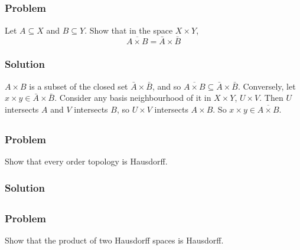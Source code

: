 
\setcounter{subsection}{8} %
\subsection{}
\subsubsection{Problem}
Let $A \subseteq X$ and $B \subseteq Y$. Show that in the space $X \times Y$,
\[\overline{A \times B} = \bar A \times \bar B \]
\subsubsection{Solution}
$A \times B$ is a subset of the closed set $\bar A \times \bar B$, and so $\overline{A \times B} \subseteq \bar A \times \bar B$. Conversely, let $x \times y \in \bar A \times \bar B$. Consider any basis neighbourhood of it in $X \times Y$, $U \times V$. Then $U$ intersects $A$ and $V$ intersects $B$, so $U \times V$ intersects $A \times B$. So $x \times y \in \overline{A \times B}$. 


\setcounter{subsection}{9} %
\subsection{}

\subsubsection{Problem}
Show that every order topology is Hausdorff.
\subsubsection{Solution}
\todo


\setcounter{subsection}{10} %
\subsection{}

\subsubsection{Problem}
Show that the product of two Hausdorff spaces is Hausdorff.
